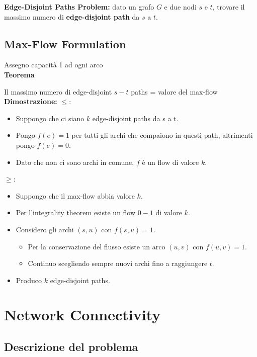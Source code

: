 \textbf{Edge-Disjoint Paths Problem:} dato un grafo $G$ e due nodi
$s$ e $t$, trovare il massimo numero di \textbf{edge-disjoint path}
da $s$ a $t$.


\subsection{Max-Flow Formulation}

Assegno capacità 1 ad ogni arco\\

\textbf{Teorema}

Il massimo numero di edge-disjoint $s-t$ paths = valore del max-flow\\

\textbf{Dimostrazione:} $\le:$
\begin{itemize}
	\item Suppongo che ci siano $k$ edge-disjoint paths da s a t.
	\item Pongo $f(e)=1$ per tutti gli archi che compaiono in questi path, altrimenti pongo $f(e)=0$.
	\item Dato che non ci sono archi in comune, $f$ è un flow di valore $k$.
\end{itemize}

$\ge:$
\begin{itemize}
	\item Suppongo che il max-flow abbia valore $k$.
	\item Per l'integrality theorem esiste un flow $0-1$ di valore $k$.
	\item Considero gli archi $(s, u)$ con $f(s, u) = 1$.
	      \begin{itemize}
		      \item Per la conservazione del flusso esiste un arco $(u,v)$ con $f(u, v) = 1$.
		      \item Continuo scegliendo sempre nuovi archi fino a raggiungere $t$.
	      \end{itemize}
	\item Produco $k$ edge-disjoint paths.
\end{itemize}

\section{Network Connectivity}

\subsection{Descrizione del problema}

